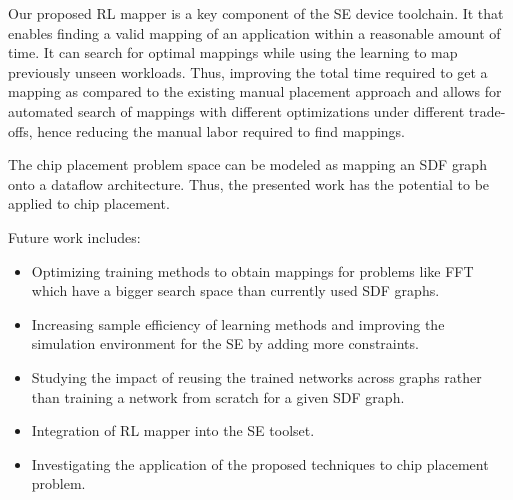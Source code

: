 Our proposed RL mapper is a key component of the SE device toolchain.
It that enables finding a valid mapping of an application within a reasonable amount of time.
It can search for optimal mappings while using the learning to map previously unseen workloads.
Thus, improving the total time required to get a mapping as compared to the existing manual placement approach and allows for automated search of mappings with different optimizations under different trade-offs, hence reducing the manual labor required to find mappings. 

The chip placement problem space can be modeled as mapping an SDF graph onto a dataflow architecture.
Thus, the presented work has the potential to be applied to chip placement.

Future work includes: 
\begin{itemize}
    \item Optimizing training methods to obtain mappings for problems like FFT which have a bigger search space than currently used SDF graphs. 
    \item Increasing sample efficiency of learning methods and improving the simulation environment for the SE by adding more constraints. 
    \item Studying the impact of reusing the trained networks across graphs rather than training a network from scratch for a given SDF graph.
    \item Integration of RL mapper into the SE toolset.
    \item Investigating the application of the proposed techniques to chip placement problem.
\end{itemize}